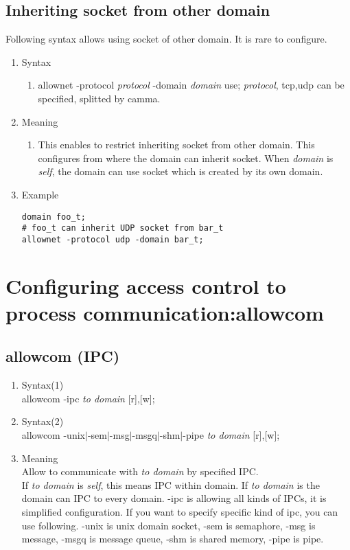 \documentclass{article}
\begin{document}
\subsection{Inheriting socket from other domain}\label{sec:socket}
Following syntax allows using socket of other domain. It is rare to configure.
\begin{enumerate}
 \item  Syntax 
	\begin{enumerate}
	 \item allownet -protocol {\it protocol}  -domain {\it domain} use;
	       {\it protocol}, tcp,udp can be specified, splitted by camma.
	\end{enumerate}

 \item Meaning\\
	\begin{enumerate}
	 \item This enables to restrict inheriting socket from other
	       domain. This configures from where the domain can
	       inherit socket. When {\it domain} is {\it self}, the domain can
	       use socket which is created by its own domain. 
	\end{enumerate}
\item Example
\begin{verbatim}
domain foo_t;
# foo_t can inherit UDP socket from bar_t
allownet -protocol udp -domain bar_t; 
\end{verbatim}
\end{enumerate}
\section{Configuring access control to process communication:allowcom}
\subsection{allowcom (IPC)}
\begin{enumerate}
 \item Syntax(1)\\
       allowcom -ipc {\it to domain} [r],[w];
 \item Syntax(2)\\
       allowcom -unix$\mid$-sem$\mid$-msg$\mid$-msgq$\mid$-shm$\mid$-pipe {\it to
       domain} [r],[w];
 \item Meaning\\
       Allow to communicate with {\it  to domain } by specified IPC.\\
       If {\it to domain } is {\it self}, this means IPC within
       domain. If {\it  to domain } is {\it *} the domain can IPC
       to every domain.
       -ipc is allowing all kinds of IPCs, it is simplified
       configuration. If you want to specify specific kind of ipc, you
       can use following.      
       -unix is unix domain socket, -sem is semaphore, -msg is message,
       -msgq is message queue, -shm is shared memory, -pipe is pipe.
\end{enumerate}
\end{document}
